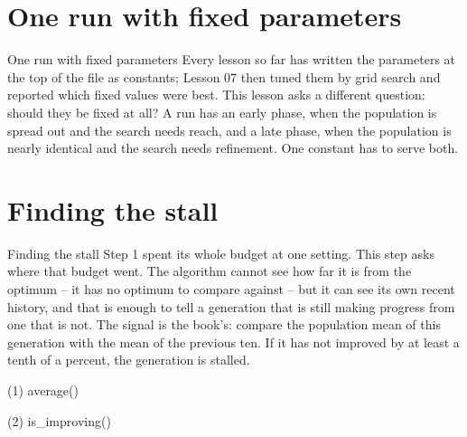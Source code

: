 \section{One run with fixed parameters}

\begin{frame}{One run with fixed parameters}
Every lesson so far has written the parameters at the top of the file as
constants; Lesson 07 then tuned them by grid search and reported which fixed
values were best. This lesson asks a different question: should they be fixed
at all? A run has an early phase, when the population is spread out and the
search needs reach, and a late phase, when the population is nearly identical
and the search needs refinement. One constant has to serve both.
\end{frame}


\section{Finding the stall}

\begin{frame}{Finding the stall}
Step 1 spent its whole budget at one setting. This step asks where that budget
went. The algorithm cannot see how far it is from the optimum -- it has no
optimum to compare against -- but it can see its own recent history, and that
is enough to tell a generation that is still making progress from one that is
not. The signal is the book's: compare the population mean of this generation
with the mean of the previous ten. If it has not improved by at least a tenth
of a percent, the generation is stalled.
\end{frame}

\begin{frame}[fragile]{(1) average()}

\end{frame}

\begin{frame}[fragile]{(2) is\_improving()}

\end{frame}

